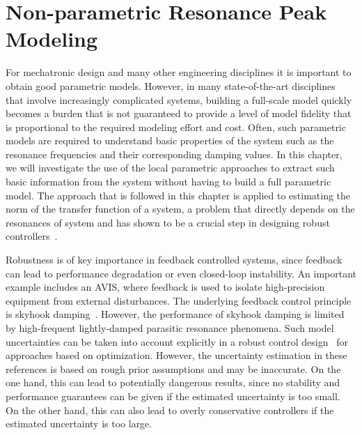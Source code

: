 \chapter{Non-parametric Resonance Peak Modeling}
\label{sec:hinf}
\def\thisDir{ch04-lrmhinf}
\glsresetall

\newcommand{\wnValue}{\ensuremath{0.95 \unit{rad/s}}}
\newcommand{\dampingValue}{\ensuremath{0.025}}
\newcommand{\TsValue}{\ensuremath{1 \unit{s}}}


For mechatronic design and many other engineering disciplines it is important to obtain good parametric models.
However, in many state-of-the-art disciplines that involve increasingly complicated systems, building a full-scale model quickly becomes a burden that is not guaranteed to provide a level of model fidelity that is proportional to the required modeling effort and cost.
Often, such parametric models are required to understand basic properties of the system such as the resonance frequencies and their corresponding damping values.
In this chapter, we will investigate the use of the local parametric approaches to extract such basic information from the system without having to build a full parametric model.
The approach that is followed in this chapter is applied to estimating the \Hinf{} norm of the transfer function of a system, a problem that directly depends on the resonances of system and has shown to be a crucial step in designing robust controllers~\citep{Oomen2016}.

Robustness is of key importance in feedback controlled systems, since feedback can lead to performance degradation or even closed-loop instability.
An important example includes an \gls{AVIS}, where feedback is used to isolate high-precision equipment from external disturbances. 
The underlying feedback control principle is skyhook damping~\citep{Karnopp1995,Collette2011}. 
However, the performance of skyhook damping is limited by high-frequent lightly-damped parasitic resonance phenomena.
Such model uncertainties can be taken into account explicitly in a robust control design~\citep{Zhang2005HybridAvis} for approaches based on \Hinf{} optimization.
However, the uncertainty estimation in these references is based on rough prior assumptions and may be inaccurate. 
On the one hand, this can lead to potentially dangerous results, since no stability and performance guarantees can be given if the estimated uncertainty is too small. 
On the other hand, this can also lead to overly conservative controllers if the estimated uncertainty is too large.

